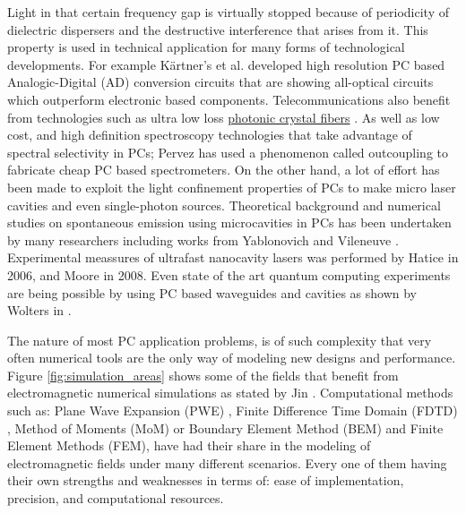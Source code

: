 Light in that certain frequency gap is virtually stopped because of periodicity of dielectric dispersers and the destructive interference that arises from it. This property is used in technical application for many forms of technological developments. For example Kärtner's et al. developed high resolution PC based Analogic-Digital (AD) conversion circuits \cite{F.X.Kaertner2006} that are showing all-optical circuits which outperform electronic based components. Telecommunications also benefit from technologies such as ultra low loss \href{http://en.wikipedia.org/wiki/Photonic-crystal_fiber}{photonic crystal fibers} \cite{A.M.Apetrei2005}. As well as low cost, and high definition spectroscopy technologies that take advantage of spectral selectivity in PCs; Pervez \cite{Pervez2010} has used a phenomenon called outcoupling to fabricate cheap PC based spectrometers. On the other hand, a lot of effort has been made to exploit the light confinement properties of PCs to make micro laser cavities and even single-photon sources. Theoretical background and numerical studies on spontaneous emission using microcavities in PCs has been undertaken by many researchers including works from Yablonovich and Vileneuve \cite{Yablonovich1987,Yablonovich1991,Villeneuve1996}. Experimental meassures of ultrafast nanocavity lasers was performed by Hatice \cite{Altug2006} in 2006, and Moore \cite{Moore2008} in 2008. Even state of the art quantum computing experiments are being possible by using PC based waveguides and cavities as shown by Wolters in \cite{Wolters2010}.

The nature of most PC application problems, is of such complexity that very often numerical tools are the only way of modeling new designs and performance. Figure \ref{fig:simulation_areas} shows some of the fields that benefit from electromagnetic numerical simulations as stated by Jin \cite{Jin2010}.  Computational methods such as: Plane Wave Expansion (PWE) \cite{StevenG.Johnson2001,Loaiza2011},  Finite Difference Time Domain (FDTD) \cite{A.M.Apetrei2005,Oskooi2009}, Method of Moments (MoM) or Boundary Element Method (BEM) and Finite Element Methods (FEM)\cite{Rodriguez2005,Masanori2001}, have had their share in the modeling of electromagnetic fields under many different scenarios. Every one of them having their own strengths and weaknesses in terms of: ease of implementation, precision, and computational resources.

